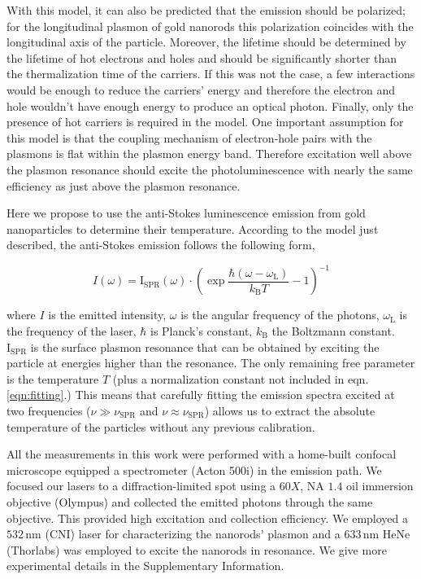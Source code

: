 \documentclass[journal=nalefd,manuscript=letter]{achemso}
\newcommand{\nm}{\ensuremath{\,\textrm{nm}}}
\begin{document}
With this model, it can also be predicted that the emission should be polarized;
for the longitudinal plasmon of gold nanorods this polarization coincides with
the longitudinal axis of the particle\cite{He2015}. Moreover, the lifetime
should be determined by the lifetime of hot electrons and holes and should be
significantly shorter than the thermalization time of the carriers. If this was
not the case, a few interactions would be enough to reduce the carriers' energy
and therefore the electron and hole wouldn't have enough energy to produce an
optical photon. Finally, only the presence of hot carriers is required in the
model. One important assumption for this model is that the coupling 
mechanism of electron-hole pairs with the plasmons is flat within the plasmon 
energy band. Therefore excitation well above the plasmon resonance should excite the
photoluminescence with nearly the same efficiency as just above the plasmon
resonance\cite{Cheng2015}. 

Here we propose to use the anti-Stokes luminescence emission from gold
nanoparticles to determine their temperature. According to the model just
described, the anti-Stokes emission follows the following form,

\begin{equation}\label{eqn:fitting}
	I(\omega) =
	\textrm{I}_{\textrm{SPR}}(\omega)\cdot\left(\exp\frac{\hbar(\omega-\omega_\textrm{L})}{k_\textrm{B}T}-1\right)^{-1}
\end{equation}

\noindent where $I$ is the emitted intensity, $\omega$ is the angular frequency
of the photons, $\omega_\textrm{L}$ is the frequency of the laser, $\hbar$ is
Planck's constant, $k_\textrm{B}$ the Boltzmann constant.
$\textrm{I}_{\textrm{SPR}}$ is the surface plasmon resonance that can be
obtained by exciting the particle at energies higher than the resonance. The
only remaining free parameter is the temperature $T$ (plus a normalization
constant not included in eqn. \ref{eqn:fitting}.) This means that carefully
fitting the emission spectra excited at two frequencies
($\nu\gg\nu_{\textrm{SPR}}$ and $\nu\approx\nu_{\textrm{SPR}}$) allows us to
extract the absolute temperature of the particles without any previous
calibration.



All the measurements in this work were performed with a home-built confocal
microscope equipped a spectrometer (Acton 500i) in the emission path.  We focused
our lasers to a diffraction-limited spot using a $60X$, NA $1.4$ oil immersion
objective (Olympus) and collected the emitted photons through the same
objective. This provided high excitation and collection efficiency.
We employed a $532\nm$ (CNI) laser for characterizing the nanorods' plasmon and
a $633\nm$ HeNe (Thorlabs) was employed to excite the nanorods in resonance.
We give more experimental details in the Supplementary Information.
\end{document}
